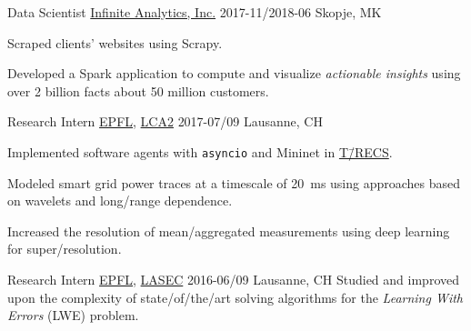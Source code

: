 \documentclass[%
version=last,%
fontsize=11pt,%
paper=A4,%
headinclude=false,%
footinclude=false,%
headlines=0,%
footlines=0,%
areasetadvanced,%
toc=bibnumbered,%
]{scrartcl}%
\begin{document}
\begin{minipage}[t]{0.575\textwidth}
  \WorkEntry%
  {Data Scientist}%
  {\href{http://infiniteanalytics.com/}{Infinite Analytics, Inc.}}%
  {2017-11/2018-06}%
  {Skopje, MK}%
  {%
    \begin{citemize}
    \item Scraped clients’ websites using Scrapy.
    \item Developed a Spark application to compute and visualize
      \emph{actionable insights} using over \num{2} billion facts about \num{50}
      million customers.
    \end{citemize}%
  }

  \WorkEntry%
  {Research Intern}%
  {\href{https://epfl.ch/}{EPFL}, \href{http://lca.epfl.ch/}{LCA2}}%
  {2017-07/09}%
  {Lausanne, CH}%
  {%
    \begin{citemize}
    \item Implemented software agents with \texttt{asyncio} and
      Mininet in \href{https://smartgrid.epfl.ch/t-recs/}{T\=/RECS}.
    \item Modeled smart grid power traces at a timescale of \SI{20}{\ms} using
      approaches based on wavelets and long\-/range dependence.
    \item Increased the resolution of mean\-/aggregated measurements using deep
      learning for super\-/resolution.
    \end{citemize}%
  }

  \WorkEntry%
  {Research Intern}%
  {\href{https://epfl.ch/}{EPFL}, \href{https://lasec.epfl.ch/}{LASEC}}%
  {2016-06/09}%
  {Lausanne, CH}%
  {%
    Studied and improved upon the complexity of state\-/of\-/the\-/art solving
    algorithms for the \emph{Learning With Errors} (LWE) problem.%
  }
\end{minipage}%
\hfill%
\end{document}

